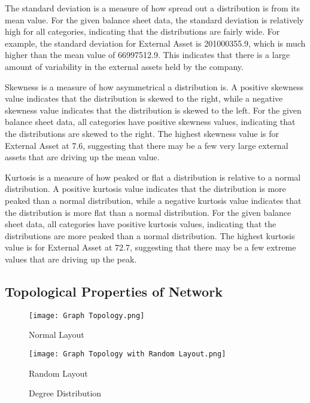 The standard deviation is a measure of how spread out a distribution is from its mean value\cite{bland1996statistics}. For the given balance sheet data, the standard deviation is relatively high for all categories, indicating that the distributions are fairly wide. For example, the standard deviation for External Asset is 201000355.9, which is much higher than the mean value of 66997512.9. This indicates that there is a large amount of variability in the external assets held by the company.

Skewness is a measure of how asymmetrical a distribution is\cite{bowley1920elements}. A positive skewness value indicates that the distribution is skewed to the right, while a negative skewness value indicates that the distribution is skewed to the left. For the given balance sheet data, all categories have positive skewness values, indicating that the distributions are skewed to the right. The highest skewness value is for External Asset at 7.6, suggesting that there may be a few very large external assets that are driving up the mean value.

Kurtosis is a measure of how peaked or flat a distribution is relative to a normal distribution\cite{pearson1905fehlergesetz}. A positive kurtosis value indicates that the distribution is more peaked than a normal distribution, while a negative kurtosis value indicates that the distribution is more flat than a normal distribution. For the given balance sheet data, all categories have positive kurtosis values, indicating that the distributions are more peaked than a normal distribution. The highest kurtosis value is for External Asset at 72.7, suggesting that there may be a few extreme values that are driving up the peak.

\subsection{Topological Properties of Network}

\begin{figure}[H]
    \centering
    \begin{minipage}{0.49\textwidth}
    \centering
    \texttt{[image: Graph Topology.png]}
    \caption{Normal Layout}\label{fig:Degree Distribution}
    \end{minipage}
    \centering
    \begin{minipage}{0.49\textwidth}
    \centering
    \texttt{[image: Graph Topology with Random Layout.png]}
    \caption{Random Layout}\label{fig:Degree Distribution with Random Layout}
    \end{minipage}
    \caption{Degree Distribution}
\end{figure}

